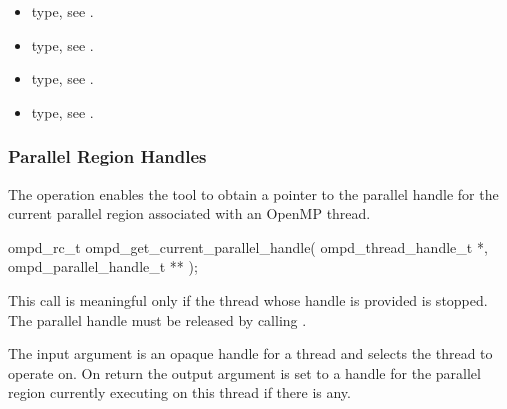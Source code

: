 
\crossreferences
\begin{itemize}
  \item {} type, see .
	\item {} type, see .
	\item {} type, see .
	\item {} type, see .
\end{itemize}

\subsubsection{Parallel Region Handles}

\label{subsubsubsec:ompd_get_current_parallel_handle}
\summary
The   operation enables the tool to obtain a pointer to
the parallel handle for the current parallel region associated with an OpenMP thread.

\format

\begin{cspecific}
\begin{ompSyntax}
ompd_rc_t ompd_get_current_parallel_handle(
  ompd_thread_handle_t *,
  ompd_parallel_handle_t **
);
\end{ompSyntax}
\end{cspecific}


\descr
This call is meaningful only if the thread whose handle is provided is stopped. The parallel handle
must be released by calling .

\argdesc
The input argument  is an opaque handle for a thread and selects the thread to operate on.
On return the output argument  is set to a handle for the parallel region
currently executing on this thread if there is any.

